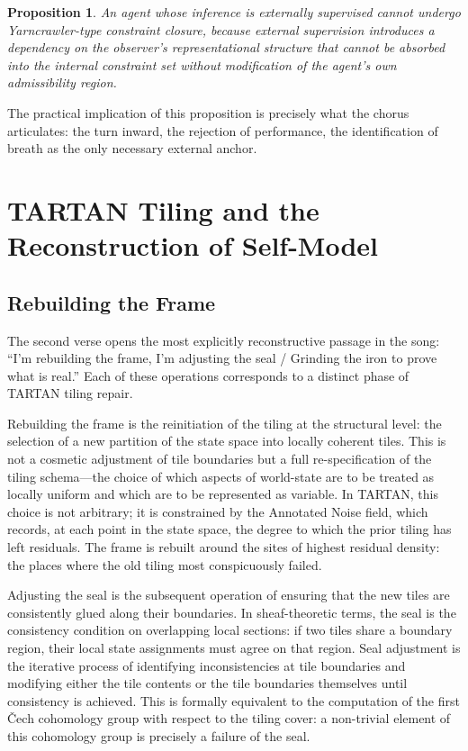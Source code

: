\documentclass[12pt, a4paper]{article}
\newtheorem{proposition}{Proposition}
\begin{document}
\begin{proposition}
An agent whose inference is externally supervised cannot undergo Yarncrawler-type constraint closure, because external supervision introduces a dependency on the observer's representational structure that cannot be absorbed into the internal constraint set without modification of the agent's own admissibility region.
\end{proposition}

The practical implication of this proposition is precisely what the chorus articulates: the turn inward, the rejection of performance, the identification of breath as the only necessary external anchor.

\section{TARTAN Tiling and the Reconstruction of Self-Model}

\subsection{Rebuilding the Frame}

The second verse opens the most explicitly reconstructive passage in the song: ``I'm rebuilding the frame, I'm adjusting the seal / Grinding the iron to prove what is real.'' Each of these operations corresponds to a distinct phase of TARTAN tiling repair.

Rebuilding the frame is the reinitiation of the tiling at the structural level: the selection of a new partition of the state space into locally coherent tiles. This is not a cosmetic adjustment of tile boundaries but a full re-specification of the tiling schema---the choice of which aspects of world-state are to be treated as locally uniform and which are to be represented as variable. In TARTAN, this choice is not arbitrary; it is constrained by the Annotated Noise field, which records, at each point in the state space, the degree to which the prior tiling has left residuals. The frame is rebuilt around the sites of highest residual density: the places where the old tiling most conspicuously failed.

Adjusting the seal is the subsequent operation of ensuring that the new tiles are consistently glued along their boundaries. In sheaf-theoretic terms, the seal is the consistency condition on overlapping local sections: if two tiles share a boundary region, their local state assignments must agree on that region. Seal adjustment is the iterative process of identifying inconsistencies at tile boundaries and modifying either the tile contents or the tile boundaries themselves until consistency is achieved. This is formally equivalent to the computation of the first Čech cohomology group with respect to the tiling cover: a non-trivial element of this cohomology group is precisely a failure of the seal.
\end{document}
